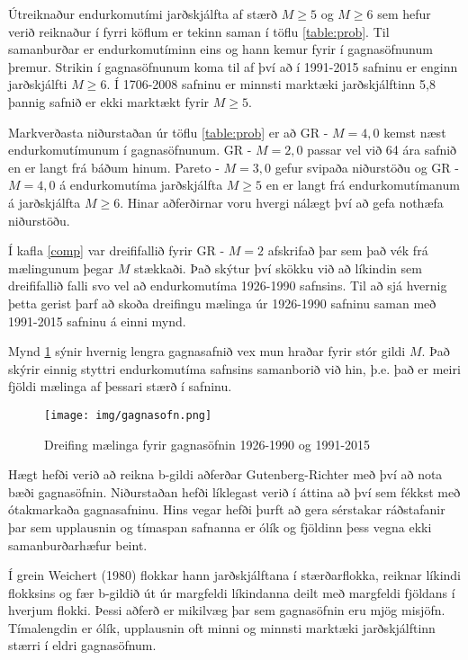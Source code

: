 \documentclass[10pt,a4paper,titlepage,twoside]{article}
\begin{document}
Útreiknaður endurkomutími jarðskjálfta af stærð $M\geq5$ og $M\geq6$ sem hefur verið reiknaður í fyrri köflum er tekinn saman í töflu \ref{table:prob}. Til samanburðar er endurkomutíminn eins og hann kemur fyrir í gagnasöfnunum þremur. Strikin í gagnasöfnunum koma til af því að í 1991-2015 safninu er enginn jarðskjálfti $M\geq6$. Í 1706-2008 safninu er minnsti marktæki jarðskjálftinn 5,8 þannig safnið er ekki marktækt fyrir $M\geq5$. 

Markverðasta niðurstaðan úr töflu \ref{table:prob} er að GR - $M=4,0$ kemst næst endurkomutímunum í gagnasöfnunum. GR - $M=2,0$ passar vel við 64 ára safnið en er langt frá báðum hinum. Pareto - $M=3,0$ gefur svipaða niðurstöðu og GR - $M=4,0$ á endurkomutíma jarðskjálfta $M\geq5$ en er langt frá endurkomutímanum á jarðskjálfta $M\geq6$. Hinar aðferðirnar voru hvergi nálægt því að gefa nothæfa niðurstöðu.

Í kafla \ref{comp} var dreififallið fyrir GR - $M=2$ afskrifað þar sem það vék frá mælingunum þegar $M$ stækkaði. Það skýtur því skökku við að líkindin sem dreififallið falli svo vel að endurkomutíma 1926-1990 safnsins. Til að sjá hvernig þetta gerist þarf að skoða dreifingu mælinga úr 1926-1990 safninu saman með 1991-2015 safninu á einni mynd.

Mynd \ref{fig:gagnasofn} sýnir hvernig lengra gagnasafnið vex mun hraðar fyrir stór gildi $M$. Það skýrir einnig styttri endurkomutíma safnsins samanborið við hin, þ.e. það er meiri fjöldi mælinga af þessari stærð í safninu.

\begin{figure}[h]
  \centering
  \texttt{[image: img/gagnasofn.png]}
  \vspace{-4mm}
  \caption{Dreifing mælinga fyrir gagnasöfnin 1926-1990 og 1991-2015}
  \label{fig:gagnasofn}
\end{figure}

Hægt hefði verið að reikna b-gildi aðferðar Gutenberg-Richter með því að nota bæði gagnasöfnin. Niðurstaðan hefði líklegast verið í áttina að því sem fékkst með ótakmarkaða gagnasafninu. Hins vegar hefði þurft að gera sérstakar ráðstafanir þar sem upplausnin og tímaspan safnanna er ólík og fjöldinn þess vegna ekki samanburðarhæfur beint.

Í grein Weichert (1980) flokkar hann jarðskjálftana í stærðarflokka, reiknar líkindi flokksins og fær b-gildið út úr margfeldi líkindanna deilt með margfeldi fjöldans í hverjum flokki. Þessi aðferð er mikilvæg þar sem gagnasöfnin eru mjög misjöfn. Tímalengdin er ólík, upplausnin oft minni og minnsti marktæki jarðskjálftinn stærri í eldri gagnasöfnum.
\end{document}
